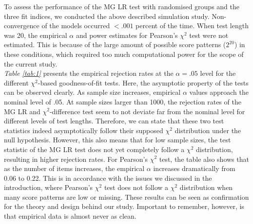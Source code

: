 \documentclass[Royal,sageapa,times,doublespace]{sagej}
\begin{document}
To assess the performance of the MG LR test with randomised groups and the three fit indices, we conducted the above described simulation study. Non-convergence of the models occurred $<.001$ percent of the time. When test length was 20, the empirical $\alpha$ and power estimates for Pearson's $\chi^2$ test were not estimated. This is because of the large amount of possible score patterns ($2^{20}$) in these conditions, which required too much computational power for the scope of the current study. \\
\indent \textit{Table \ref{tab:1}} presents the empirical rejection rates at the $\alpha = .05$ level for the different $\chi^2$-based goodness-of-fit tests. Here, the asymptotic property of the tests can be observed clearly. As sample size increases, empirical $\alpha$ values approach the nominal level of .05. At sample sizes larger than 1000, the rejection rates of the MG LR and $\chi^2$-difference test seem to not deviate far from the nominal level for different levels of test lengths. Therefore, we can state that these two test statistics indeed asymptotically follow their supposed $\chi^2$ distribution under the null hypothesis. However, this also means that for low sample sizes, the test statistic of the MG LR test does not yet completely follow a $\chi^2$ distribution, resulting in higher rejection rates. For Pearson's $\chi^2$ test, the table also shows that as the number of items increases, the empirical $\alpha$ increases dramatically from 0.06 to 0.22. This is in accordance with the issues we discussed in the introduction, where Pearson's $\chi^2$ test does not follow a $\chi^2$ distribution when many score patterns are low or missing. These results can be seen as confirmation for the theory and design behind our study. Important to remember, however, is that empirical data is almost never as clean.
\end{document}
